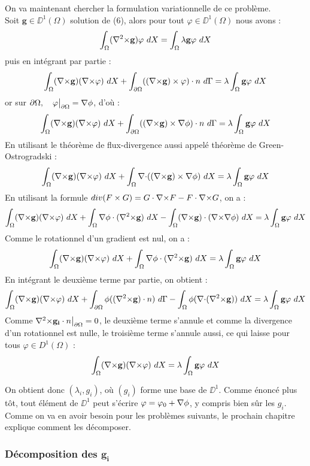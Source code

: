 On va maintenant chercher la formulation variationnelle de ce problème.\\
Soit $\mathbf{g}\in \DD^1(\Omega)$ solution de (6), alors pour tout $\varphi\in \DD^1(\Omega)$ nous avons :
\[
\int_\Omega (\rott \mathbf{g})\varphi\ dX = \int_\Omega\lambda \mathbf{g}\varphi\ dX
\]
puis en intégrant par partie :
\[
\int_\Omega ({\nabla\times} \mathbf{g})({\nabla\times}\varphi)\ dX + \int_{\partial\Omega} (({\nabla\times} \mathbf{g})\times \varphi)\cdot n\ d\Gamma = \lambda\int_\Omega \mathbf{g}\varphi\ dX
\]
or sur $\partial\Omega,\quad \varphi{\big\rvert_{\partial\Omega}}={\nabla}\phi$, d'où :
\[
\int_\Omega (\rot \mathbf{g})(\rot\varphi)\ dX + \int_{\partial\Omega} ((\rot \mathbf{g})\times \grad\phi)\cdot n\ d\Gamma = \lambda\int_\Omega \mathbf{g}\varphi\ dX
\]
En utilisant le théorème de flux-divergence aussi appelé théorème de Green-Ostrogradski :
\[
\int_\Omega (\rot \mathbf{g})(\rot\varphi)\ dX + \int_\Omega \diverg((\rot \mathbf{g})\times \grad\phi)\ dX = \lambda\int_\Omega \mathbf{g}\varphi\ dX
\]
En utilisant la formule $div(F\times G) = G\cdot {\nabla\times} F - F\cdot {\nabla\times} G$, on a :
\[
\int_\Omega (\rot \mathbf{g})(\rot\varphi)\ dX + \int_\Omega \grad\phi\cdot(\rott \mathbf{g})\ dX -\int_\Omega (\rot \mathbf{g})\cdot (\rot\grad\phi)\ dX  = \lambda\int_\Omega \mathbf{g}\varphi\ dX
\]
Comme le rotationnel d'un gradient est nul, on a :
\[
\int_\Omega ({\nabla\times} \mathbf{g})({\nabla\times}\varphi)\ dX + \int_\Omega {\nabla}\phi\cdot({\nabla^2\times} \mathbf{g})\ dX  = \lambda\int_\Omega \mathbf{g}\varphi\ dX
\]
En intégrant le deuxième terme par partie, on obtient :
\[
\int_\Omega ({\nabla\times} \mathbf{g})({\nabla\times}\varphi)\ dX + \int_{\partial\Omega} \phi(({\nabla^2\times} \mathbf{g})\cdot n)\ d\Gamma - \int_\Omega \phi({\nabla\cdot}({\nabla^2\times} \mathbf{g}))\ dX  = \lambda\int_\Omega \mathbf{g}\varphi\ dX
\]
Comme ${\nabla^2\times}  \mathbf{g_i}\cdot n{\big\rvert_{\partial\Omega}} = 0$, le deuxième terme s'annule et comme la divergence d'un rotationnel est nulle, le troisième terme s'annule aussi, ce qui laisse pour tous $\varphi\in D^1(\Omega)$ :
\begin{equation}
\label{fveigen}
\int_\Omega ({\nabla\times} \mathbf{g})({\nabla\times}\varphi)\ dX = \lambda\int_\Omega \mathbf{g}\varphi\ dX
\end{equation}

On obtient donc $(\lambda_i,g_i)$, où $(g_i)$ forme une base de $\DD^1$. Comme énoncé plus tôt, tout élément de $\DD^1$ peut s'écrire $\varphi = \varphi_0 + {\nabla}\phi$, y compris bien sûr les $g_i$. Comme on va en avoir besoin pour les problèmes suivants, le prochain chapitre explique comment les décomposer.

\subsubsection{Décomposition des $\mathbf{g_i}$}
\label{decomp}

